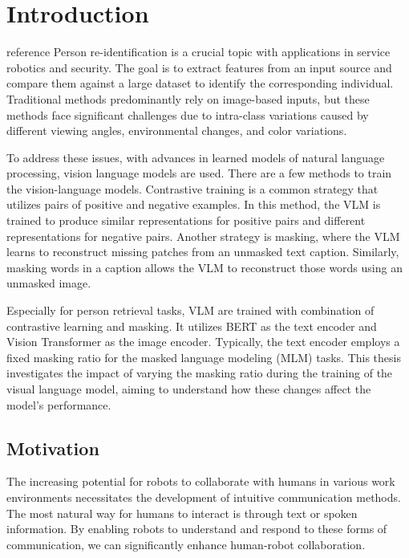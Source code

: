 \chapter{Introduction}
{\color{red} reference}
Person re-identification is a crucial topic with applications in service robotics and security. The goal is to extract features from an input source and compare them against a large dataset to identify the corresponding individual. Traditional methods predominantly rely on image-based inputs, but these methods face significant challenges due to intra-class variations caused by different viewing angles, environmental changes, and color variations.

To address these issues, with advances in learned models of natural language processing, vision language models are used. There are a few methods to train the vision-language models. 
Contrastive training is a common strategy that utilizes pairs of positive and negative examples. In this method, the VLM is trained to produce similar representations for positive pairs and different representations for negative pairs. Another strategy is masking, where the VLM learns to reconstruct missing patches from an unmasked text caption. Similarly, masking words in a caption allows the VLM to reconstruct those words using an unmasked image.


Especially for person retrieval tasks, VLM are trained with combination of contrastive learning and masking. It utilizes BERT as the text encoder and Vision Transformer as the image encoder. Typically, the text encoder employs a fixed masking ratio for the masked language modeling (MLM) tasks. This thesis investigates the impact of varying the masking ratio during the training of the visual language model, aiming to understand how these changes affect the model's performance.

\section{Motivation}
The increasing potential for robots to collaborate with humans in various work environments necessitates the development of intuitive communication methods. The most natural way for humans to interact is through text or spoken information. By enabling robots to understand and respond to these forms of communication, we can significantly enhance human-robot collaboration.


